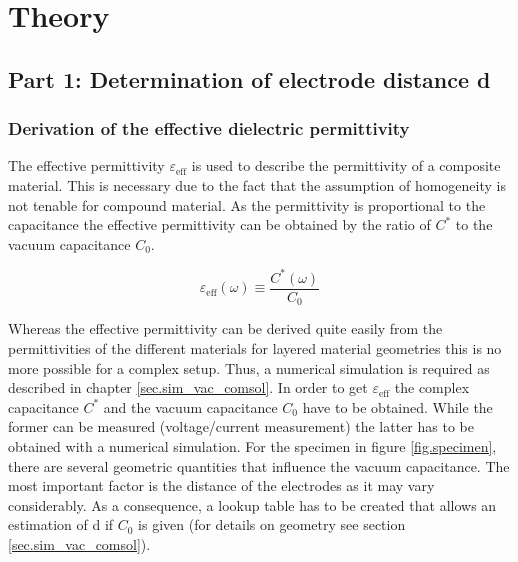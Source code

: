\chapter{Theory}
\section{Part 1: Determination of electrode distance d}

\subsection{Derivation of the effective dielectric permittivity}
\label{subsec.Derivationeffective}
The effective permittivity $\varepsilon_{\textrm{eff}}$  is used to describe the permittivity of a composite material. This is necessary due to the fact that the assumption of homogeneity is not tenable for compound material. As the permittivity is proportional to the capacitance the effective permittivity can be obtained by the ratio of $C^*$  to the vacuum capacitance $C_0$.

\begin{equation}
\varepsilon_{\textrm{eff}}(\omega) \equiv \frac{C^*(\omega)}{C_0} 
\end{equation}

Whereas the effective permittivity can be derived quite easily from the permittivities of the different materials for layered material geometries this is no more  possible for a complex setup. Thus, a numerical simulation is required as described in chapter \ref{sec.sim_vac_comsol}. In order to get $\varepsilon_{\textrm{eff}}$ the complex capacitance $C^*$ and the vacuum capacitance $C_0$ have to be obtained. While the former can be measured (voltage/current measurement) the latter has to be obtained with a numerical simulation. 
For the specimen in figure \ref{fig.specimen}, there are several geometric quantities that influence the vacuum capacitance. The most important factor is the distance of the electrodes as it may vary considerably. As a consequence, a lookup table has to be created that allows an estimation of d if $C_0$ is given (for details on geometry see section \ref{sec.sim_vac_comsol}). 

 


